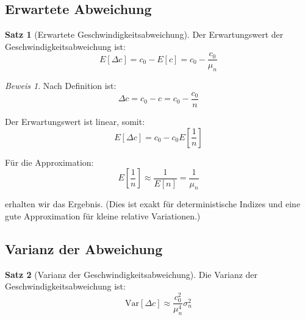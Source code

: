 \documentclass[a4paper,12pt]{article}
\theoremstyle{definition}
\newtheorem{satz}{Satz}[section]
\theoremstyle{remark}
\newtheorem*{beweis}{Beweis}
\newcommand{\cLight}{c}
\newcommand{\deviation}{\Delta}
\begin{document}
\subsection{Erwartete Abweichung}

\begin{satz}[Erwartete Geschwindigkeitsabweichung]
Der Erwartungswert der Geschwindigkeitsabweichung ist:
\begin{equation}
    E[\deviation \cLight] = \cLight_0 - E[\cLight] = \cLight_0 - \frac{\cLight_0}{\mu_n}
\end{equation}
\end{satz}

\begin{beweis}
Nach Definition ist:
\begin{equation}
    \deviation \cLight = \cLight_0 - \cLight = \cLight_0 - \frac{\cLight_0}{n}
\end{equation}

Der Erwartungswert ist linear, somit:
\begin{equation}
    E[\deviation \cLight] = \cLight_0 - \cLight_0 E\left[\frac{1}{n}\right]
\end{equation}

Für die Approximation:
\begin{equation}
    E\left[\frac{1}{n}\right] \approx \frac{1}{E[n]} = \frac{1}{\mu_n}
\end{equation}

erhalten wir das Ergebnis. (Dies ist exakt für deterministische Indizes und eine gute Approximation für kleine relative Variationen.)
\end{beweis}

\subsection{Varianz der Abweichung}

\begin{satz}[Varianz der Geschwindigkeitsabweichung]
Die Varianz der Geschwindigkeitsabweichung ist:
\begin{equation}
    \text{Var}[\deviation \cLight] \approx \frac{\cLight_0^2}{\mu_n^4} \sigma_n^2
\end{equation}
\end{satz}
\end{document}
